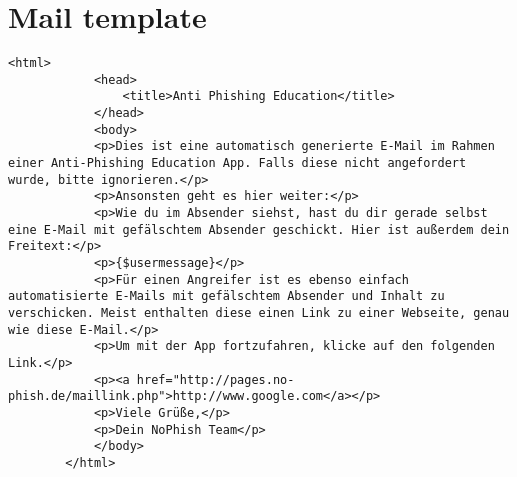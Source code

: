 \section{Mail template}
\label{a:mail}
\begin{lstlisting}
<html>
			<head>
				<title>Anti Phishing Education</title>
			</head>
			<body>
			<p>Dies ist eine automatisch generierte E-Mail im Rahmen einer Anti-Phishing Education App. Falls diese nicht angefordert wurde, bitte ignorieren.</p>
			<p>Ansonsten geht es hier weiter:</p>
			<p>Wie du im Absender siehst, hast du dir gerade selbst eine E-Mail mit gefälschtem Absender geschickt. Hier ist außerdem dein Freitext:</p>
			<p>{$usermessage}</p>
			<p>Für einen Angreifer ist es ebenso einfach automatisierte E-Mails mit gefälschtem Absender und Inhalt zu verschicken. Meist enthalten diese einen Link zu einer Webseite, genau wie diese E-Mail.</p>
			<p>Um mit der App fortzufahren, klicke auf den folgenden Link.</p>
			<p><a href="http://pages.no-phish.de/maillink.php">http://www.google.com</a></p>
			<p>Viele Grüße,</p>
			<p>Dein NoPhish Team</p>
			</body>
		</html>
\end{lstlisting}